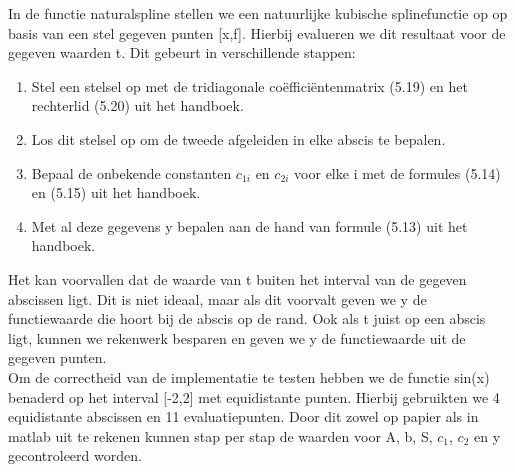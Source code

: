 In de functie naturalspline stellen we een natuurlijke kubische splinefunctie op op basis van een stel gegeven punten [x,f]. Hierbij evalueren we dit resultaat voor de gegeven waarden t. Dit gebeurt in verschillende stappen:
\begin{enumerate}
\item Stel een stelsel op met de tridiagonale co\"effici\"entenmatrix (5.19) en het rechterlid (5.20) uit het handboek.
\item Los dit stelsel op om de tweede afgeleiden in elke abscis te bepalen.
\item Bepaal de onbekende constanten $c_{1i}$ en $c_{2i}$ voor elke i met de formules (5.14) en (5.15) uit het handboek.
\item Met al deze gegevens y bepalen aan de hand van formule (5.13) uit het handboek.
\end{enumerate}
Het kan voorvallen dat de waarde van t buiten het interval van de gegeven abscissen ligt. Dit is niet ideaal, maar als dit voorvalt geven we y de functiewaarde die hoort bij de abscis op de rand. Ook als t juist op een abscis ligt, kunnen we rekenwerk besparen en geven we y de functiewaarde uit de gegeven punten.
\\
Om de correctheid van de implementatie te testen hebben we de functie sin(x) benaderd op het interval [-2,2] met equidistante punten. Hierbij gebruikten we 4 equidistante abscissen en 11 evaluatiepunten. Door dit zowel op papier als in matlab uit te rekenen kunnen stap per stap de waarden voor A, b, S, $c_1$, $c_2$ en y gecontroleerd worden.
\\


